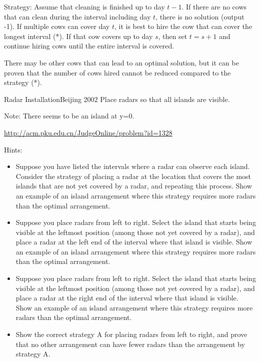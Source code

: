 Strategy: Assume that cleaning is finished up to day $t-1$. If there are no cows that can clean during the interval including day $t$, there is no solution (output -1). If multiple cows can cover day $t$, it is best to hire the cow that can cover the longest interval (*). If that cow covers up to day $s$, then set $t=s+1$ and continue hiring cows until the entire interval is covered.

There may be other cows that can lead to an optimal solution, but it can be proven that the number of cows hired cannot be reduced compared to the strategy (*).

\begin{pbox}{Radar Installation}{Beijing 2002}
Place radars so that all islands are visible.

Note: There seems to be an island at y=0.

\url{http://acm.pku.edu.cn/JudgeOnline/problem?id=1328}
\end{pbox}

Hints:
\begin{itemize}
    \setlength{\itemsep}{0pt}
    \item Suppose you have listed the intervals where a radar can observe each island. Consider the strategy of placing a radar at the location that covers the most islands that are not yet covered by a radar, and repeating this process. Show an example of an island arrangement where this strategy requires more radars than the optimal arrangement.
    \item Suppose you place radars from left to right. Select the island that starts being visible at the leftmost position (among those not yet covered by a radar), and place a radar at the left end of the interval where that island is visible. Show an example of an island arrangement where this strategy requires more radars than the optimal arrangement.
    \item Suppose you place radars from left to right. Select the island that starts being visible at the leftmost position (among those not yet covered by a radar), and place a radar at the right end of the interval where that island is visible. Show an example of an island arrangement where this strategy requires more radars than the optimal arrangement.
    \item Show the correct strategy A for placing radars from left to right, and prove that no other arrangement can have fewer radars than the arrangement by strategy A.
\end{itemize}

